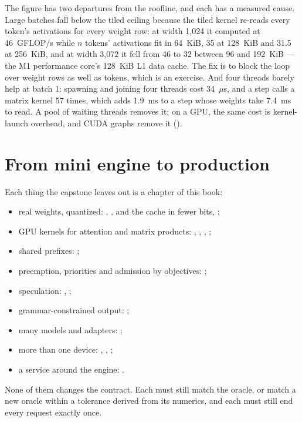 
The figure has two departures from the roofline, and each has a measured cause.
Large batches fall below the tiled ceiling because the tiled kernel re-reads
every token's activations for every weight row: at width 1,024 it computed at
46~GFLOP/s while $n$ tokens' activations fit in 64~KiB, 35 at 128~KiB and 31.5 at
256~KiB, and at width 3,072 it fell from 46 to 32 between 96 and 192~KiB --- the
M1 performance core's 128~KiB L1 data cache. The fix is to block the loop over
weight rows as well as tokens, which is an exercise. And four threads barely
help at batch 1: spawning and joining four threads cost 34~$\mu$s, and a step
calls a matrix kernel 57 times, which adds 1.9~ms to a step whose weights take
7.4~ms to read. A pool of waiting threads removes it; on a GPU, the same cost is
kernel-launch overhead, and CUDA graphs remove it ().

\section{From mini engine to production}

Each thing the capstone leaves out is a chapter of this book:
\begin{itemize}
\item real weights, quantized: ,
  , and the cache in fewer bits,
  ;
\item GPU kernels for attention and matrix products: ,
  , , ;
\item shared prefixes: ;
\item preemption, priorities and admission by objectives: ;
\item speculation: , ;
\item grammar-constrained output: ;
\item many models and adapters: ;
\item more than one device: ,
  , ;
\item a service around the engine: .
\end{itemize}
None of them changes the contract. Each must still match the oracle, or match a
new oracle within a tolerance derived from its numerics, and each must still end
every request exactly once.

